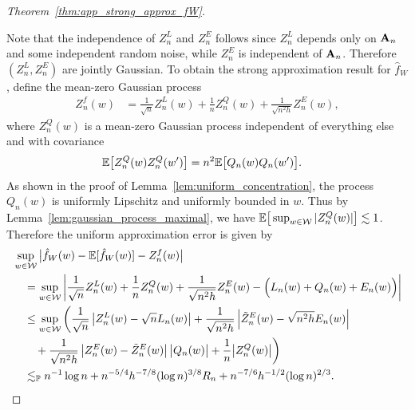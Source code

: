 \begin{proof}[Theorem~\ref{thm:app_strong_approx_fW}]
\begin{enumerate}[label=(\roman*)]
  \end{enumerate}
  Note that the independence of
  $Z_n^L$ and $Z_n^E$
  follows since $Z_n^L$
  depends only on $\mathbf{A}_n$ and some independent random noise,
  while $Z_n^E$ is independent of $\mathbf{A}_n$.
  Therefore $(Z_n^L, Z_n^E)$ are jointly Gaussian.
  To obtain the strong approximation result
  for $\hat f_W$,
  define the mean-zero Gaussian process
  \begin{align*}
    Z_n^f(w)
    &=
    \frac{1}{\sqrt n} Z_n^L(w)
    + \frac{1}{n} Z_n^Q(w)
    + \frac{1}{\sqrt{n^2h}} Z_n^E(w),
  \end{align*}
  where $Z_n^Q(w)$
  is a mean-zero Gaussian process
  independent of everything else and
  with covariance
  \begin{align*}
    \mathbb{E}\big[
      Z_n^Q(w)
      Z_n^Q(w')
    \big]
    &=
    n^2 \mathbb{E}\big[
      Q_n(w)
      Q_n(w')
    \big].
  \end{align*}
  As shown in the proof of
  Lemma~\ref{lem:uniform_concentration},
  the process
  $Q_n(w)$ is uniformly Lipschitz
  and uniformly bounded in $w$.
  Thus by Lemma~\ref{lem:gaussian_process_maximal},
  we have
  $\mathbb{E}\big[\sup_{w \in \mathcal{W}}
  |Z_n^Q(w)|\big]
  \lesssim 1$.
  Therefore the uniform approximation error is given by
  \begin{align*}
    &
    \sup_{w \in \mathcal{W}}
    \big|
    \hat f_W(w) - \mathbb{E}[\hat f_W(w)]
    - Z_n^f(w)
    \big|
    \\
    &\quad=
    \sup_{w \in \mathcal{W}}
    \left|
    \frac{1}{\sqrt n} Z_n^L(w)
    + \frac{1}{n} Z_n^Q(w)
    + \frac{1}{\sqrt{n^2h}} Z_n^E(w)
    - \Big(
      L_n(w) + Q_n(w) + E_n(w)
    \Big)
    \right| \\
    &\quad\leq
    \sup_{w \in \mathcal{W}}
    \bigg(
      \frac{1}{\sqrt n}
      \left|
      Z_n^L(w) - \sqrt{n} L_n(w)
      \right|
      + \frac{1}{\sqrt{n^2h}}
      \left|
      \tilde Z_n^E(w) - \sqrt{n^2h} E_n(w)
      \right| \\
      &\qquad+
      \frac{1}{\sqrt{n^2h}}
      \left|
      Z_n^E(w) - \tilde Z_n^E(w)
      \right|
      \big| Q_n(w) \big|
      + \frac{1}{n}
      \big| Z_n^Q(w) \big|
    \bigg) \\
    &\quad\lesssim_{\mathbb{P}}
    n^{-1} \log n
    + n^{-5/4} h^{-7/8} (\log n)^{3/8} R_n
    + n^{-7/6} h^{-1/2} (\log n)^{2/3}.
  \end{align*}



\end{proof}
